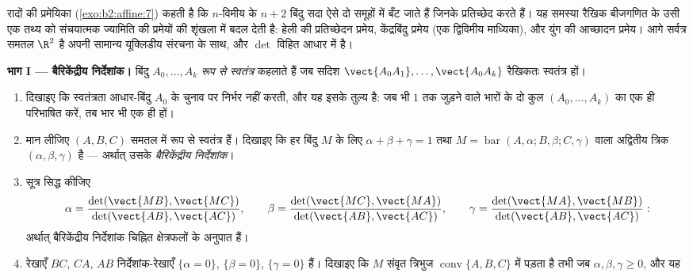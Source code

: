 \begin{problem}\label{pb:b2:affine:1}
रादों की प्रमेयिका (\cref{exo:b2:affine:7}) कहती है कि $n$-विमीय  के $n + 2$ बिंदु सदा
ऐसे दो समूहों में बँट जाते हैं जिनके  प्रतिच्छेद करते हैं। यह
समस्या रैखिक बीजगणित के उसी एक तथ्य को संचयात्मक ज्यामिति की प्रमेयों की
शृंखला में बदल देती है: हेली की प्रतिच्छेदन प्रमेय, केंद्रबिंदु प्रमेय (एक
द्विविमीय माध्यिका), और युंग की आच्छादन प्रमेय। आगे सर्वत्र समतल $\R^2$ है
अपनी सामान्य यूक्लिडीय संरचना के साथ, और $\det$ विहित आधार में 
है।

\medskip
\noindent\textbf{भाग I --- बैरिकेंद्रीय निर्देशांक।} बिंदु $A_0, \dots, A_k$ \emph{
रूप से स्वतंत्र} कहलाते हैं जब सदिश $\vect{A_0A_1}, \dots, \vect{A_0A_k}$ रैखिकतः स्वतंत्र हों।
\begin{enumerate}
  \item दिखाइए कि  स्वतंत्रता आधार-बिंदु $A_0$ के चुनाव पर निर्भर नहीं
        करती, और यह इसके तुल्य है: जब भी $1$ तक जुड़ने वाले भारों के दो
        कुल $(A_0,
        \dots, A_k)$ का एक ही  परिभाषित करें, तब भार भी एक ही हों।
  \item मान लीजिए $(A, B, C)$ समतल में  रूप से स्वतंत्र हैं। दिखाइए कि हर बिंदु
        $M$ के लिए $\alpha + \beta +
        \gamma = 1$ तथा $M = \operatorname{bar}(A, \alpha; B,
        \beta; C, \gamma)$ वाला अद्वितीय त्रिक $(\alpha, \beta, \gamma)$ है --- अर्थात्
        उसके \emph{बैरिकेंद्रीय निर्देशांक}।
  \item {} सूत्र सिद्ध कीजिए
        \[
        \alpha = \frac{\det(\vect{MB},
        \vect{MC})}{\det(\vect{AB}, \vect{AC})},
        \qquad
        \beta = \frac{\det(\vect{MC},
        \vect{MA})}{\det(\vect{AB}, \vect{AC})},
        \qquad
        \gamma = \frac{\det(\vect{MA},
        \vect{MB})}{\det(\vect{AB}, \vect{AC})} :
        \]
        अर्थात् बैरिकेंद्रीय निर्देशांक चिह्नित क्षेत्रफलों के अनुपात हैं।
  \item रेखाएँ $BC$, $CA$, $AB$ निर्देशांक-रेखाएँ $\{\alpha = 0\}$, $\{\beta = 0\}$, $\{\gamma = 0\}$ हैं।
        दिखाइए कि $M$ संवृत त्रिभुज $\operatorname{conv}\{A, B, C\}$ में पड़ता है तभी जब $\alpha, \beta,
        \gamma \geq 0$, और यह

\end{enumerate}
\end{problem}

